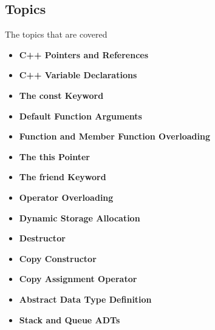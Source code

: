 \documentclass{report}
\begin{document}
    \subsection{Topics}
    The topics that are covered
    \begin{itemize}
        \item \textbf{C++ Pointers and References}
        \item \textbf{C++ Variable Declarations }
        \item \textbf{The const Keyword}
        \item \textbf{Default Function Arguments }
        \item \textbf{Function and Member Function Overloading }
        \item \textbf{The this Pointer}
        \item \textbf{The friend Keyword }
        \item \textbf{Operator Overloading}
        \item \textbf{Dynamic Storage Allocation}
        \item \textbf{Destructor}
        \item \textbf{Copy Constructor }
        \item \textbf{Copy Assignment Operator }
        \item \textbf{Abstract Data Type Definition}
        \item \textbf{Stack and Queue ADTs}
    \end{itemize}

    \pagebreak 
    \bigbreak \noindent 
\end{document}
